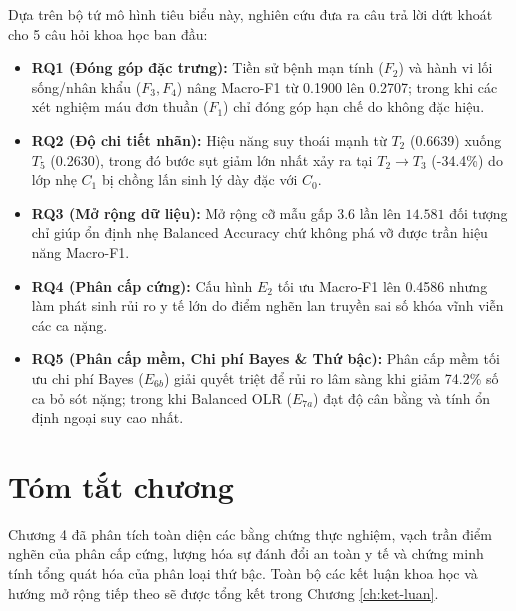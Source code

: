 Dựa trên bộ tứ mô hình tiêu biểu này, nghiên cứu đưa ra câu trả lời dứt khoát cho 5 câu hỏi khoa học ban đầu:
\begin{itemize}
    \item \textbf{RQ1 (Đóng góp đặc trưng):} Tiền sử bệnh mạn tính ($F_2$) và hành vi lối sống/nhân khẩu ($F_3, F_4$) nâng Macro-F1 từ 0.1900 lên 0.2707; trong khi các xét nghiệm máu đơn thuần ($F_1$) chỉ đóng góp hạn chế do không đặc hiệu.
    \item \textbf{RQ2 (Độ chi tiết nhãn):} Hiệu năng suy thoái mạnh từ $T_2$ (0.6639) xuống $T_5$ (0.2630), trong đó bước sụt giảm lớn nhất xảy ra tại $T_2 \to T_3$ (-34.4\%) do lớp nhẹ $C_1$ bị chồng lấn sinh lý dày đặc với $C_0$.
    \item \textbf{RQ3 (Mở rộng dữ liệu):} Mở rộng cỡ mẫu gấp 3.6 lần lên $14.581$ đối tượng chỉ giúp ổn định nhẹ Balanced Accuracy chứ không phá vỡ được trần hiệu năng Macro-F1.
    \item \textbf{RQ4 (Phân cấp cứng):} Cấu hình $E_2$ tối ưu Macro-F1 lên 0.4586 nhưng làm phát sinh rủi ro y tế lớn do điểm nghẽn lan truyền sai số khóa vĩnh viễn các ca nặng.
    \item \textbf{RQ5 (Phân cấp mềm, Chi phí Bayes \& Thứ bậc):} Phân cấp mềm tối ưu chi phí Bayes ($E_{6b}$) giải quyết triệt để rủi ro lâm sàng khi giảm 74.2\% số ca bỏ sót nặng; trong khi Balanced OLR ($E_{7a}$) đạt độ cân bằng và tính ổn định ngoại suy cao nhất.
\end{itemize}

\section{Tóm tắt chương}
\label{sec:tom-tat-chuong-4}

Chương 4 đã phân tích toàn diện các bằng chứng thực nghiệm, vạch trần điểm nghẽn của phân cấp cứng, lượng hóa sự đánh đổi an toàn y tế và chứng minh tính tổng quát hóa của phân loại thứ bậc. Toàn bộ các kết luận khoa học và hướng mở rộng tiếp theo sẽ được tổng kết trong Chương \ref{ch:ket-luan}.

